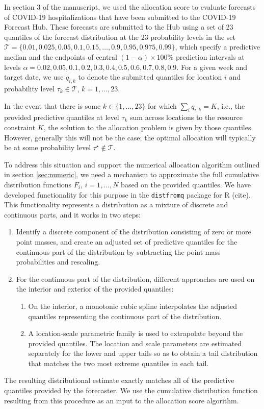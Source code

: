 \documentclass{article}\usepackage[]{graphicx}\usepackage[]{xcolor}
\begin{document}
In section 3 of the manuscript, we used the allocation score to evaluate forecasts of COVID-19 hospitalizations that have been submitted to the COVID-19 Forecast Hub. These forecasts are submitted to the Hub using a set of 23 quantiles of the forecast distribution at the 23 probability levels in the set $\mathcal{T} = \{0.01, 0.025, 0.05, 0.1, 0.15, \ldots, \allowbreak 0.9, 0.95, 0.975, 0.99\}$, which specify a predictive median and the endpoints of central $(1 - \alpha) \times 100\%$ prediction intervals at levels $\alpha = 0.02, 0.05, 0.1, 0.2, \allowbreak 0.3, 0.4, 0.5, 0.6, \allowbreak 0.7, 0.8, 0.9$. For a given week and target date, we use $q_{i,k}$ to denote the submitted quantiles for location $i$ and probability level $\tau_k \in \mathcal{T}$, $k = 1, \ldots, 23$.

In the event that there is some $k \in \{1, \ldots, 23\}$ for which $\sum_i q_{i,k} = K$, i.e., the provided predictive quantiles at level $\tau_k$ sum across locations to the resource constraint $K$, the solution to the allocation problem is given by those quantiles. However, generally this will not be the case; the optimal allocation will typically be at some probability level $\tau^\star \notin \mathcal{T}$.

To address this situation and support the numerical allocation algorithm outlined in section \ref{sec:numeric}, we need a mechanism to approximate the full cumulative distribution functions $F_i$, $i = 1, \ldots, N$ based on the provided quantiles. We have developed functionality for this purpose in the \verb`distfromq` package for R (cite). This functionality represents a distribution as a mixture of discrete and continuous parts, and it works in two steps:
\begin{enumerate}
  \item Identify a discrete component of the distribution consisting of zero or more point masses, and create an adjusted set of predictive quantiles for the continuous part of the distribution by subtracting the point mass probabilities and rescaling.
  \item For the continuous part of the distribution, different approaches are used on the interior and exterior of the provided quantiles:
  \begin{enumerate}
    \item On the interior, a monotonic cubic spline interpolates the adjusted quantiles representing the continuous part of the distribution.
    \item A location-scale parametric family is used to extrapolate beyond the provided quantiles. The location and scale parameters are estimated separately for the lower and upper tails so as to obtain a tail distribution that matches the two most extreme quantiles in each tail.
  \end{enumerate}
\end{enumerate}
The resulting distributional estimate exactly matches all of the predictive quantiles provided by the forecaster. We use the cumulative distribution function resulting from this procedure as an input to the allocation score algorithm.
\end{document}
